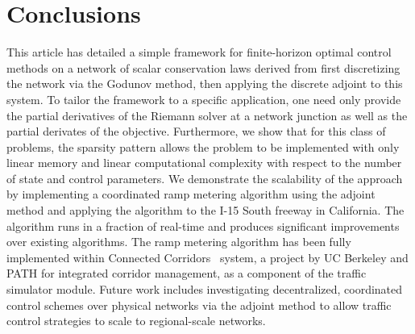 \section{Conclusions\label{sec:Conclusions}}

This article has detailed a simple framework for finite-horizon optimal control 
methods on a network of scalar conservation laws derived from first 
discretizing the network via the Godunov method, then applying the discrete 
adjoint to this system. To tailor the framework to a specific application, one 
need only provide the partial derivatives of the Riemann solver at a network 
junction as well as the partial derivates of the objective. Furthermore, we 
show that for this class of problems, the sparsity pattern allows the problem 
to be implemented with only linear memory and linear computational complexity 
with respect to the number of state and control parameters. We demonstrate the 
scalability of the approach by implementing a coordinated ramp metering 
algorithm using the adjoint method and applying the algorithm to the I-15 South freeway in California. The algorithm runs in a fraction of real-time 
and produces significant improvements over existing algorithms. The ramp metering algorithm has been fully implemented within Connected Corridors~\cite{CC} system, a project by UC Berkeley and PATH for integrated corridor management, as a component of the traffic simulator module. Future work 
includes investigating decentralized, coordinated control schemes over physical 
networks via the adjoint method to allow traffic control strategies to scale to 
regional-scale networks.
